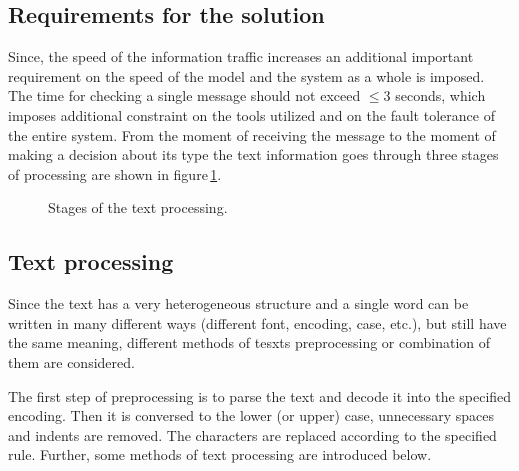 \documentclass[12pt]{jpconf}
\begin{document}
\subsection{Requirements for the solution}
Since, the speed of the information traffic increases an additional important requirement on the speed of the model and the system as a whole is imposed. The time for checking a single message should not exceed $\leqslant3$ seconds, which imposes additional constraint on the tools utilized and on the fault tolerance of the entire system.
From the moment of receiving the message to the moment of making a decision about its type the text information goes through three stages of processing are shown in figure\,\ref{fig:00}.
\begin{figure}[h!]
\centering
{}
\caption{\label{fig:00}Stages of the text processing.}
\end{figure}

\subsection{Text processing}
Since the text has a very heterogeneous structure and a single word can be written in many different ways (different font, encoding, case, etc.), but still have the same meaning, different methods of tesxts preprocessing or combination of them are considered.

The first step of preprocessing is to parse the text and decode it into the specified encoding. Then it is conversed to the lower (or upper) case, unnecessary spaces and indents are removed. The characters are replaced according to the specified rule. Further, some methods of text processing are introduced below.
\end{document}
